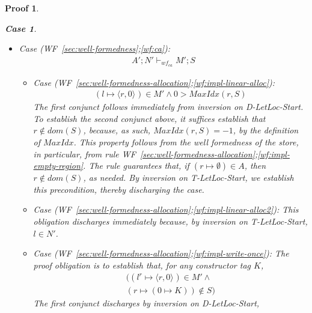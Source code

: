 \documentclass[showabstract,showacknowledgments,showpreface,showdedication,school]{iuphd}
\newtheorem*{bcase}{Case}
\theoremstyle{nonumberplain}
\newtheorem{nproof}{Proof}
\newcommand{\keywd}[1]{\mathit{#1}}
\newcommand{\skeywd}[1]{\mathit{#1}}
\newcommand{\DC}{\keywd{K}}
\newcommand{\loc}{\skeywd{l}}
\newcommand{\concreteloc}[3]{\ensuremath{\langle #1, #2 \rangle ^{#3}}}
\newcommand{\reg}{\skeywd{r}}
\newcommand{\STOR}{\keywd{S}}
\newcommand{\MENV}{\keywd{M}}
\newcommand{\AENV}{\keywd{A}}
\newcommand{\NENV}{\keywd{N}}
\newcommand{\locreg}[2]{\ensuremath{{#1}^{#2}}}
\newcommand{\allocptr}[2]{\keywd{MaxIdx}(#1,#2)}
\newcommand{\storewfca}[4]{\ensuremath{#1;#2 \vdash_{wf_{ca}} #3;#4}}
\newcommand{\refwellformed}[2]{WF~\ref{#1};\ref{#2}}
\newcommand{\dletlocstart}{D-LetLoc-Start}
\newcommand{\tllstart}{T-LetLoc-Start}
\begin{document}
\begin{nproof}
\begin{bcase}
\begin{itemize}
\begin{itemize}
      given in the premise of the lemma is requirement
      \refwellformed{sec:well-formedness-constructors}{wfconstr:constraint-start}.
      The specific requirement is to establish that
      \begin{align*}
      (\locreg{\loc}{\reg} \mapsto \concreteloc{\reg}{0}{}) \in \MENV',
      \end{align*}
      which follows immediately by inversion on \dletlocstart{}.
      \item Case (\refwellformed{sec:well-formedness}{wf:ca}):
      \begin{align*}
      \storewfca{\AENV'}{\NENV'}{\MENV'}{\STOR}
      \end{align*}
        \begin{itemize}
        \item Case (\refwellformed{sec:well-formedness-allocation}{wf:impl-linear-alloc}):
        \begin{align*}
                  (\loc \mapsto \concreteloc{\reg}{0}{}) \in \MENV' \wedge
          0 > \allocptr{\reg}{\STOR}
        \end{align*}
        The first conjunct follows immediately from inversion on \dletlocstart{}.
        To establish the second conjunct above, it suffices establish
        that $\reg \not \in dom(\STOR)$,
        because, as such, $\allocptr{\reg}{\STOR} = -1$, by the definition of $MaxIdx$.
        This property follows from the well formedness of the
        store, in particular, from rule
        \refwellformed{sec:well-formedness-allocation}{wf:impl-empty-region}.
        The rule guarantees that, if $(\reg \mapsto \emptyset) \in \AENV$, then
        $\reg \not \in dom(\STOR)$, as needed.
        By inversion on \tllstart{}, we establish this precondition, thereby
        discharging the case.
        \item Case (\refwellformed{sec:well-formedness-allocation}{wf:impl-linear-alloc2}):
        This obligation discharges immediately because, by inversion on \tllstart{}, $\loc \in \NENV'$.
        \item Case (\refwellformed{sec:well-formedness-allocation}{wf:impl-write-once}):
        The proof obligation is to establish that, for any constructor tag $\DC$,
        \begin{align*}
         ((\locreg{\loc}{\reg} \mapsto \concreteloc{\reg}{0}{}) \in \MENV' \wedge \\
          (\reg \mapsto (0 \mapsto \DC)) \not \in \STOR)
        \end{align*}
        The first conjunct discharges by inversion on \dletlocstart{},

\end{itemize}
\end{itemize}
\end{itemize}
\end{bcase}
\end{nproof}
\end{document}
